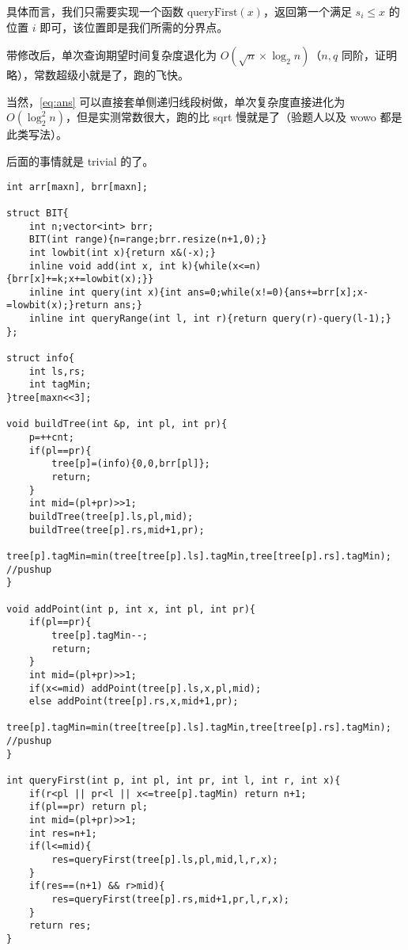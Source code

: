 \documentclass[14pt,a4paper]{article}
\begin{document}
具体而言，我们只需要实现一个函数 $\text{queryFirst}(x) $，返回第一个满足 $s_i \le x$ 的位置 $i$ 即可，该位置即是我们所需的分界点。

带修改后，单次查询期望时间复杂度退化为 $O(\sqrt{n} \times \log_2 n)$（$n,q$ 同阶，证明略），常数超级小就是了，跑的飞快。

当然，\eqref{eq:ans} 可以直接套单侧递归线段树做，单次复杂度直接进化为 $O(\log_2^2 n)$，但是实测常数很大，跑的比 sqrt 慢就是了（验题人以及 wowo 都是此类写法）。

后面的事情就是 trivial 的了。

\begin{verbatim}
int arr[maxn], brr[maxn];

struct BIT{
    int n;vector<int> brr;
    BIT(int range){n=range;brr.resize(n+1,0);}
    int lowbit(int x){return x&(-x);}
    inline void add(int x, int k){while(x<=n){brr[x]+=k;x+=lowbit(x);}}
    inline int query(int x){int ans=0;while(x!=0){ans+=brr[x];x-=lowbit(x);}return ans;}
    inline int queryRange(int l, int r){return query(r)-query(l-1);}
};

struct info{
    int ls,rs;
    int tagMin;
}tree[maxn<<3];

void buildTree(int &p, int pl, int pr){
    p=++cnt;
    if(pl==pr){
        tree[p]=(info){0,0,brr[pl]};
        return;
    }
    int mid=(pl+pr)>>1;
    buildTree(tree[p].ls,pl,mid);
    buildTree(tree[p].rs,mid+1,pr);
    tree[p].tagMin=min(tree[tree[p].ls].tagMin,tree[tree[p].rs].tagMin); //pushup
}

void addPoint(int p, int x, int pl, int pr){
    if(pl==pr){
        tree[p].tagMin--;
        return;
    }
    int mid=(pl+pr)>>1;
    if(x<=mid) addPoint(tree[p].ls,x,pl,mid);
    else addPoint(tree[p].rs,x,mid+1,pr);
    tree[p].tagMin=min(tree[tree[p].ls].tagMin,tree[tree[p].rs].tagMin); //pushup
}

int queryFirst(int p, int pl, int pr, int l, int r, int x){
    if(r<pl || pr<l || x<=tree[p].tagMin) return n+1;
    if(pl==pr) return pl;
    int mid=(pl+pr)>>1;
    int res=n+1;
    if(l<=mid){
        res=queryFirst(tree[p].ls,pl,mid,l,r,x);
    }
    if(res==(n+1) && r>mid){
        res=queryFirst(tree[p].rs,mid+1,pr,l,r,x);
    }
    return res;
}


\end{verbatim}
\end{document}
